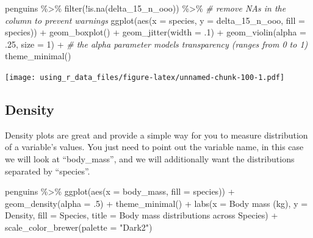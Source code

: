 \documentclass[
]{book}
\newenvironment{Shaded}{\begin{snugshade}}{\end{snugshade}}
\newcommand{\AttributeTok}[1]{\textcolor[rgb]{0.77,0.63,0.00}{#1}}
\newcommand{\CommentTok}[1]{\textcolor[rgb]{0.56,0.35,0.01}{\textit{#1}}}
\newcommand{\DecValTok}[1]{\textcolor[rgb]{0.00,0.00,0.81}{#1}}
\newcommand{\FunctionTok}[1]{\textcolor[rgb]{0.00,0.00,0.00}{#1}}
\newcommand{\NormalTok}[1]{#1}
\newcommand{\SpecialCharTok}[1]{\textcolor[rgb]{0.00,0.00,0.00}{#1}}
\newcommand{\StringTok}[1]{\textcolor[rgb]{0.31,0.60,0.02}{#1}}
\begin{document}
\begin{Shaded}
\begin{Highlighting}[]
\NormalTok{penguins }\SpecialCharTok{\%\textgreater{}\%}
  \FunctionTok{filter}\NormalTok{(}\SpecialCharTok{!}\FunctionTok{is.na}\NormalTok{(delta\_15\_n\_ooo)) }\SpecialCharTok{\%\textgreater{}\%}  \CommentTok{\# remove NAs in the column to prevent warnings}
  \FunctionTok{ggplot}\NormalTok{(}\FunctionTok{aes}\NormalTok{(}\AttributeTok{x =}\NormalTok{ species, }\AttributeTok{y =}\NormalTok{ delta\_15\_n\_ooo, }\AttributeTok{fill =}\NormalTok{ species)) }\SpecialCharTok{+} 
  \FunctionTok{geom\_boxplot}\NormalTok{() }\SpecialCharTok{+}
  \FunctionTok{geom\_jitter}\NormalTok{(}\AttributeTok{width =}\NormalTok{ .}\DecValTok{1}\NormalTok{) }\SpecialCharTok{+}
  \FunctionTok{geom\_violin}\NormalTok{(}\AttributeTok{alpha =}\NormalTok{ .}\DecValTok{25}\NormalTok{, }\AttributeTok{size =} \DecValTok{1}\NormalTok{) }\SpecialCharTok{+}  \CommentTok{\# the alpha parameter models transparency (ranges from 0 to 1)}
  \FunctionTok{theme\_minimal}\NormalTok{()}
\end{Highlighting}
\end{Shaded}

\texttt{[image: using\_r\_data\_files/figure-latex/unnamed-chunk-100-1.pdf]}

\hypertarget{density}{%
\subsection{Density}\label{density}}

Density plots are great and provide a simple way for you to measure distribution of a variable's values.
You just need to point out the variable name, in this case we will look at ``body\_mass'', and we will additionally want the distributions separated by ``species''.

\begin{Shaded}
\begin{Highlighting}[]
\NormalTok{penguins }\SpecialCharTok{\%\textgreater{}\%} 
  \FunctionTok{ggplot}\NormalTok{(}\FunctionTok{aes}\NormalTok{(}\AttributeTok{x =}\NormalTok{ body\_mass, }\AttributeTok{fill =}\NormalTok{ species)) }\SpecialCharTok{+} 
  \FunctionTok{geom\_density}\NormalTok{(}\AttributeTok{alpha =}\NormalTok{ .}\DecValTok{5}\NormalTok{) }\SpecialCharTok{+}
  \FunctionTok{theme\_minimal}\NormalTok{() }\SpecialCharTok{+}
  \FunctionTok{labs}\NormalTok{(}\AttributeTok{x =} \StringTok{\textquotesingle{}Body mass (kg)\textquotesingle{}}\NormalTok{, }\AttributeTok{y =} \StringTok{\textquotesingle{}Density\textquotesingle{}}\NormalTok{,}
       \AttributeTok{fill =} \StringTok{\textquotesingle{}Species\textquotesingle{}}\NormalTok{, }
       \AttributeTok{title =} \StringTok{\textquotesingle{}Body mass distributions across Species\textquotesingle{}}\NormalTok{) }\SpecialCharTok{+}
  \FunctionTok{scale\_color\_brewer}\NormalTok{(}\AttributeTok{palette =} \StringTok{"Dark2"}\NormalTok{)}
\end{Highlighting}
\end{Shaded}
\end{document}
